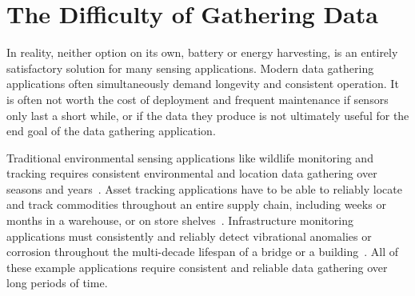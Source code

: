 

\section{The Difficulty of Gathering Data}
In reality, neither option on its own, battery or energy harvesting, is an entirely satisfactory solution for many sensing applications. 
Modern data gathering applications often simultaneously demand longevity and consistent operation.
It is often not worth the cost of deployment and frequent maintenance if sensors only last a short while, or if the data they produce is not ultimately useful for the end goal of the data gathering application.

Traditional environmental sensing applications like wildlife monitoring and tracking requires consistent environmental and location data gathering over seasons and years~\cite{mainwaring2002wireless,juang2002energy}.
Asset tracking applications have to be able to reliably locate and track commodities throughout an entire supply chain, including weeks or months in a warehouse, or on store shelves~\cite{williotpixel}.
Infrastructure monitoring applications must consistently and reliably detect vibrational anomalies or corrosion throughout the multi-decade lifespan of a bridge or a building~\cite{afanasov2020battery,jagtap2021repurposing}.
All of these example applications require consistent and reliable data gathering over long periods of time.

